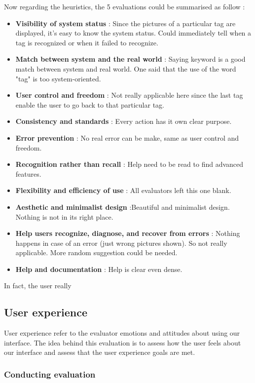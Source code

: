 \documentclass[11pt,a4paper]{article}
\begin{document}
Now regarding the heuristics, the 5 evaluations could be summarised as follow :
\begin{itemize}
	\item \textbf{Visibility of system status} : Since the pictures of a particular tag are displayed, it's easy to know the system status. Could immediately tell when a tag is recognized or when it failed to recognize.
	\item \textbf{Match between system and the real world} : Saying keyword is a good match between system and real world. One said that the use of the word "tag" is too system-oriented. 
	\item \textbf{User control and freedom} : Not really applicable here since the last tag enable the user to go back to that particular tag.
	\item \textbf{Consistency and standards} : Every action has it own clear purpose. 
	\item \textbf{Error prevention} : No real error can be make, same as user control and freedom.
	\item \textbf{Recognition rather than recall} : Help need to be read to find advanced features.
	\item \textbf{Flexibility and efficiency of use} : All evaluators left this one blank.
	\item \textbf{Aesthetic and minimalist design} :Beautiful and minimalist design. Nothing is not in its right place.
	\item \textbf{Help users recognize, diagnose, and recover from errors} : Nothing happens in case of an error (just wrong pictures shown). So not really applicable. More random suggestion could be needed.
	\item \textbf{Help and documentation} : Help is clear even dense.
\end{itemize}



In fact, the user really


\subsection{User experience}

User experience refer to the evaluator emotions and attitudes about using our interface. The idea behind this evaluation is to assess how the user feels about our interface and assess that the user experience goals are met.


\subsubsection{Conducting evaluation}
\end{document}
